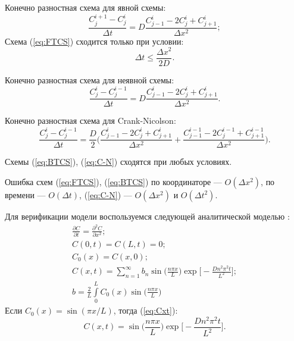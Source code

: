 Конечно разностная схема для явной схемы:
\begin{equation}
	\label{eq:FTCS}
	\frac{C^{i+1}_{j} - C^{i}_{j}}{\Delta t} = D \frac{C^{i}_{j-1} -2C^{i}_{j} + C^{i}_{j+1}}{\Delta x^{2}};
\end{equation}
Схема (\ref{eq:FTCS}) сходится только при условии:
\begin{equation}
	\Delta t \leq \frac{\Delta x^{2}}{2D}. 
\end{equation}


Конечно разностная схема для неявной схемы:
\begin{equation}
	\label{eq:BTCS}
	\frac{C^{i}_{j} - C^{i-1}_{j}}{\Delta t} = D \frac{C^{i}_{j-1} -2C^{i}_{j} + C^{i}_{j+1}}{\Delta x^{2}}.
\end{equation}

Конечно разностная схема для Crank-Nicolson:
\begin{equation}
	\label{eq:C-N}
	\frac{C^{i}_{j} - C^{i-1}_{j}}{\Delta t} = \frac{D}{2} \bigg(\frac{C^{i}_{j-1} -2C^{i}_{j} + C^{i}_{j+1}}{\Delta x^{2}} + \frac{C^{i-1}_{j-1} -2C^{i-1}_{j} + C^{i-1}_{j+1}}{\Delta x^{2}}\bigg).
\end{equation}

Схемы (\ref{eq:BTCS}), (\ref{eq:C-N}) сходятся при любых условиях.

Ошибка схем (\ref{eq:FTCS}), (\ref{eq:BTCS}) по координаторе --- $O(\Delta x^2)$, по времени --- $O(\Delta t)$, (\ref{eq:C-N}) --- $O(\Delta x^2)$ и $O(\Delta t^2)$.\cite{Gerald}

Для верификации модели воспользуемся следующей аналитической моделью \cite{Erwin}:
\begin{gather}
	\frac{\partial C}{\partial t} = \frac{\partial^{2}C}{\partial x^{2}};\\
	C(0, t) = C(L, t) = 0;\\
	C_{0}(x) = C(x, 0);\\
	\label{eq:Cxt}
	C(x, t) = \sum\limits_{n=1}^{\infty}b_{n}\sin\bigg( \frac{n\pi x}{L}\bigg) \exp \bigg[ -\frac{Dn^{2}\pi^{2}t}{L^{2}}\bigg];\\
	b = \frac{2}{L}\int\limits_{0}^{L}C_{0}(x)\sin\bigg( \frac{n\pi x}{L} \bigg)
\end{gather}
Если $C_{0}(x) = \sin(\pi x/L)$, тогда (\ref{eq:Cxt}):
\begin{equation}
	\label{eq:CAnal}
	C(x, t) = \sin\bigg( \frac{n\pi x}{L} \bigg) \exp \bigg[ -\frac{Dn^{2}\pi^{2}t}{L^{2}}\bigg].
\end{equation}


